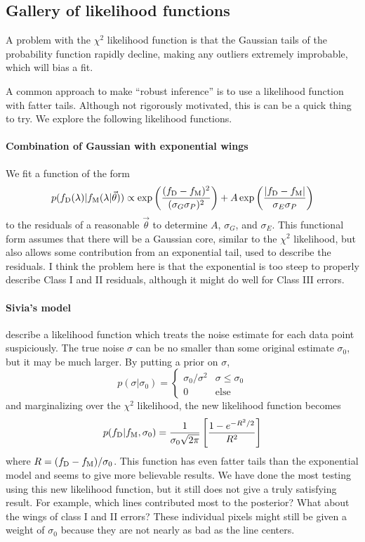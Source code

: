 \documentclass[preprint]{aastex} %
\newcommand{\vt}{\vec{\theta}}
\newcommand{\fM}{f_{\rm M}}
\newcommand{\fD}{f_{\rm D}}
\begin{document}
\subsection{Gallery of likelihood functions}
A problem with the $\chi^2$ likelihood function is that the Gaussian tails of the probability function rapidly decline, making any outliers extremely improbable, which will bias a fit. 

A common approach to make ``robust inference'' is to use a likelihood function with fatter tails. Although not rigorously motivated, this is can be a quick thing to try. We explore the following likelihood functions.

\paragraph{Combination of Gaussian with exponential wings}
We fit a function of the form
\begin{equation}
  p(\fD(\lambda) | \fM(\lambda | \vt)) \propto \exp \left (\frac{(\fD - \fM)^2}{(\sigma_G \sigma_P)^2} \right ) + A \exp \left (\frac{|\fD - \fM|}{\sigma_E \sigma_P}  \right )
\end{equation}
to the residuals of a reasonable $\vt$ to determine $A$, $\sigma_G$, and $\sigma_E$. This functional form assumes that there will be a Gaussian core, similar to the $\chi^2$ likelihood, but also allows some contribution from an exponential tail, used to describe the residuals. I think the problem here is that the exponential is too steep to properly describe Class I and II residuals, although it might do well for Class III errors.

\paragraph{Sivia's model}
\citet{ss06} describe a likelihood function which treats the noise estimate for each data point suspiciously. The true noise $\sigma$ can be no smaller than some original estimate $\sigma_0$, but it may be much larger. By putting a prior on $\sigma$, 
\begin{equation}
  p(\sigma | \sigma_0) = \left \{ \begin{array}{cc}
    \sigma_0/\sigma^2 & \sigma  \leq \sigma_0\\
    0                 & \textrm{else}
  \end{array}
    \right.
\end{equation}
and marginalizing over the $\chi^2$ likelihood, the new likelihood function becomes
\begin{equation}
  p(\fD | \fM, \sigma_0) = \frac{1}{\sigma_0 \sqrt{2 \pi}} \left [ \frac{1 - e^{-R^2/2}}{R^2} \right ] 
\end{equation}
where $R = (\fD - \fM)/\sigma_0$. This function has even fatter tails than the exponential model and seems to give more believable results. We have done the most testing using this new likelihood function, but it still does not give a truly satisfying result. For example, which lines contributed most to the posterior? What about the wings of class I and II errors? These individual pixels might still be given a weight of $\sigma_0$ because they are not nearly as bad as the line centers.
\end{document}
